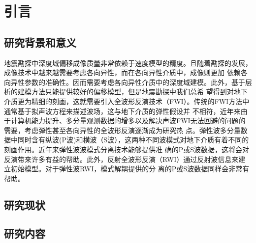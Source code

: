 \section{引言}
\subsection{研究背景和意义}
地震勘探中深度域偏移成像质量非常依赖于速度模型的精度。且随着勘探的发展，成像技术中越来越需要考虑各向异性，而在各向异性介质中，成像则更加
依赖各向异性参数的准确性。因而需要考虑各向异性介质中的深度域建模。此外，基于层析的建模方法只能提供较好的偏移模型，但是地震勘探中我们总希
望得到对地下介质更为精细的刻画，这就需要引入全波形反演技术（FWI）。传统的FWI方法中通常基于拟声波方程来描述波场，这与地下介质的弹性假设并
不相符，近年来由于计算机能力提升、多分量观测数据的增多以及解决声波FWI无法回避的问题的需要，考虑弹性甚至各向异性的全波形反演逐渐成为研究热
点。弹性波多分量数据中同时含有纵波(P波)和横波（S波），这两种不同波模式对地下介质有着不同的刻画作用。近年来弹性波波模式分离技术能够提供准
确的P或S波数据，这将会对反演带来许多有益的帮助。此外，反射全波形反演（RWI）通过反射波信息来建立初始模型。对于弹性波RWI，模式解耦提供的分
离的P或S波数据同样会非常有帮助。
\subsection{研究现状}
\subsection{研究内容}
